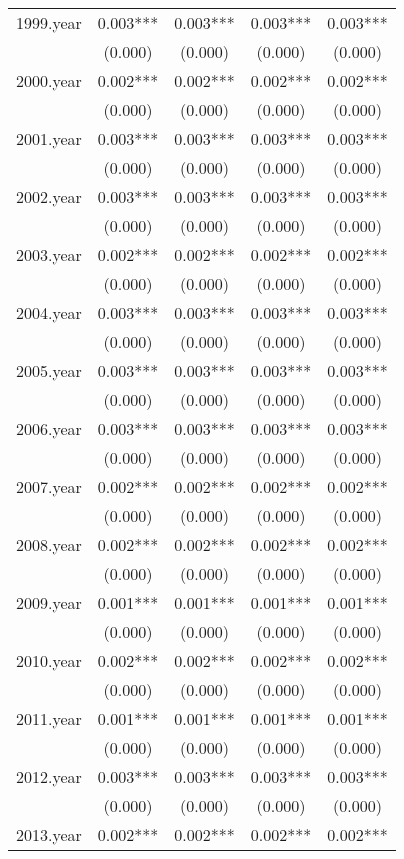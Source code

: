 \documentclass[]{article}
\begin{document}
\begin{tabular}{lcccc}
1999.year & 0.003*** & 0.003*** & 0.003*** & 0.003*** \\
 & (0.000) & (0.000) & (0.000) & (0.000) \\
2000.year & 0.002*** & 0.002*** & 0.002*** & 0.002*** \\
 & (0.000) & (0.000) & (0.000) & (0.000) \\
2001.year & 0.003*** & 0.003*** & 0.003*** & 0.003*** \\
 & (0.000) & (0.000) & (0.000) & (0.000) \\
2002.year & 0.003*** & 0.003*** & 0.003*** & 0.003*** \\
 & (0.000) & (0.000) & (0.000) & (0.000) \\
2003.year & 0.002*** & 0.002*** & 0.002*** & 0.002*** \\
 & (0.000) & (0.000) & (0.000) & (0.000) \\
2004.year & 0.003*** & 0.003*** & 0.003*** & 0.003*** \\
 & (0.000) & (0.000) & (0.000) & (0.000) \\
2005.year & 0.003*** & 0.003*** & 0.003*** & 0.003*** \\
 & (0.000) & (0.000) & (0.000) & (0.000) \\
2006.year & 0.003*** & 0.003*** & 0.003*** & 0.003*** \\
 & (0.000) & (0.000) & (0.000) & (0.000) \\
2007.year & 0.002*** & 0.002*** & 0.002*** & 0.002*** \\
 & (0.000) & (0.000) & (0.000) & (0.000) \\
2008.year & 0.002*** & 0.002*** & 0.002*** & 0.002*** \\
 & (0.000) & (0.000) & (0.000) & (0.000) \\
2009.year & 0.001*** & 0.001*** & 0.001*** & 0.001*** \\
 & (0.000) & (0.000) & (0.000) & (0.000) \\
2010.year & 0.002*** & 0.002*** & 0.002*** & 0.002*** \\
 & (0.000) & (0.000) & (0.000) & (0.000) \\
2011.year & 0.001*** & 0.001*** & 0.001*** & 0.001*** \\
 & (0.000) & (0.000) & (0.000) & (0.000) \\
2012.year & 0.003*** & 0.003*** & 0.003*** & 0.003*** \\
 & (0.000) & (0.000) & (0.000) & (0.000) \\
2013.year & 0.002*** & 0.002*** & 0.002*** & 0.002*** \\

\end{tabular}
\end{document}

